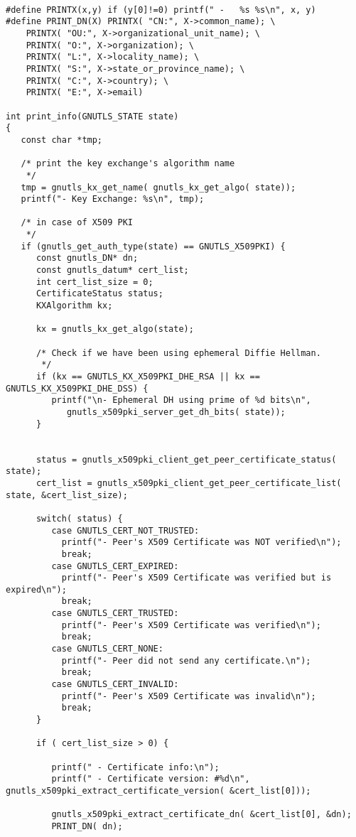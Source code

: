 \begin{verbatim}

#define PRINTX(x,y) if (y[0]!=0) printf(" -   %s %s\n", x, y)
#define PRINT_DN(X) PRINTX( "CN:", X->common_name); \
	PRINTX( "OU:", X->organizational_unit_name); \
	PRINTX( "O:", X->organization); \
	PRINTX( "L:", X->locality_name); \
	PRINTX( "S:", X->state_or_province_name); \
	PRINTX( "C:", X->country); \
	PRINTX( "E:", X->email)

int print_info(GNUTLS_STATE state)
{
   const char *tmp;

   /* print the key exchange's algorithm name
    */
   tmp = gnutls_kx_get_name( gnutls_kx_get_algo( state));
   printf("- Key Exchange: %s\n", tmp);

   /* in case of X509 PKI
    */
   if (gnutls_get_auth_type(state) == GNUTLS_X509PKI) {
      const gnutls_DN* dn;
      const gnutls_datum* cert_list;
      int cert_list_size = 0;
      CertificateStatus status;
      KXAlgorithm kx;

      kx = gnutls_kx_get_algo(state);

      /* Check if we have been using ephemeral Diffie Hellman.
       */
      if (kx == GNUTLS_KX_X509PKI_DHE_RSA || kx == GNUTLS_KX_X509PKI_DHE_DSS) {
         printf("\n- Ephemeral DH using prime of %d bits\n",
            gnutls_x509pki_server_get_dh_bits( state));
      }


      status = gnutls_x509pki_client_get_peer_certificate_status( state);
      cert_list = gnutls_x509pki_client_get_peer_certificate_list( state, &cert_list_size);

      switch( status) {
         case GNUTLS_CERT_NOT_TRUSTED:
           printf("- Peer's X509 Certificate was NOT verified\n");
           break;
         case GNUTLS_CERT_EXPIRED:
           printf("- Peer's X509 Certificate was verified but is expired\n");
           break;
         case GNUTLS_CERT_TRUSTED:
           printf("- Peer's X509 Certificate was verified\n");
           break;
         case GNUTLS_CERT_NONE:
           printf("- Peer did not send any certificate.\n");
           break;
         case GNUTLS_CERT_INVALID:
           printf("- Peer's X509 Certificate was invalid\n");
           break;
      }
		
      if ( cert_list_size > 0) {

         printf(" - Certificate info:\n");
         printf(" - Certificate version: #%d\n", gnutls_x509pki_extract_certificate_version( &cert_list[0]));

         gnutls_x509pki_extract_certificate_dn( &cert_list[0], &dn);
         PRINT_DN( dn);


\end{verbatim}
